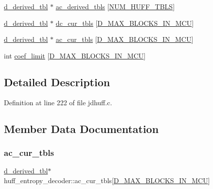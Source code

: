 \begin{DoxyCompactItemize}
\item 
\mbox{\hyperlink{structd__derived__tbl}{d\+\_\+derived\+\_\+tbl}} $\ast$ \mbox{\hyperlink{structhuff__entropy__decoder_a19edd8c7e80bfe34c21e6fe35ef90cce}{ac\+\_\+derived\+\_\+tbls}} \mbox{[}\mbox{\hyperlink{jpeglib_8h_a6b12985705944e0623b671f29dc5722e}{N\+U\+M\+\_\+\+H\+U\+F\+F\+\_\+\+T\+B\+LS}}\mbox{]}
\item 
\mbox{\hyperlink{structd__derived__tbl}{d\+\_\+derived\+\_\+tbl}} $\ast$ \mbox{\hyperlink{structhuff__entropy__decoder_a63725587525df86501d2a632152c01c0}{dc\+\_\+cur\+\_\+tbls}} \mbox{[}\mbox{\hyperlink{jpeglib_8h_af974a668decc270fb4d00587618dd110}{D\+\_\+\+M\+A\+X\+\_\+\+B\+L\+O\+C\+K\+S\+\_\+\+I\+N\+\_\+\+M\+CU}}\mbox{]}
\item 
\mbox{\hyperlink{structd__derived__tbl}{d\+\_\+derived\+\_\+tbl}} $\ast$ \mbox{\hyperlink{structhuff__entropy__decoder_af9d82cc6c9c90aa6bc3d5fc324967d7c}{ac\+\_\+cur\+\_\+tbls}} \mbox{[}\mbox{\hyperlink{jpeglib_8h_af974a668decc270fb4d00587618dd110}{D\+\_\+\+M\+A\+X\+\_\+\+B\+L\+O\+C\+K\+S\+\_\+\+I\+N\+\_\+\+M\+CU}}\mbox{]}
\item 
int \mbox{\hyperlink{structhuff__entropy__decoder_a28830ac6bc49fafca8325b1ec0472a33}{coef\+\_\+limit}} \mbox{[}\mbox{\hyperlink{jpeglib_8h_af974a668decc270fb4d00587618dd110}{D\+\_\+\+M\+A\+X\+\_\+\+B\+L\+O\+C\+K\+S\+\_\+\+I\+N\+\_\+\+M\+CU}}\mbox{]}
\end{DoxyCompactItemize}


\subsection{Detailed Description}


Definition at line 222 of file jdhuff.\+c.



\subsection{Member Data Documentation}
\mbox{\label{structhuff__entropy__decoder_af9d82cc6c9c90aa6bc3d5fc324967d7c}} 
\subsubsection{\texorpdfstring{ac\_cur\_tbls}{ac\_cur\_tbls}}
{\footnotesize\ttfamily \mbox{\hyperlink{structd__derived__tbl}{d\+\_\+derived\+\_\+tbl}}$\ast$ huff\+\_\+entropy\+\_\+decoder\+::ac\+\_\+cur\+\_\+tbls\mbox{[}\mbox{\hyperlink{jpeglib_8h_af974a668decc270fb4d00587618dd110}{D\+\_\+\+M\+A\+X\+\_\+\+B\+L\+O\+C\+K\+S\+\_\+\+I\+N\+\_\+\+M\+CU}}\mbox{]}}



